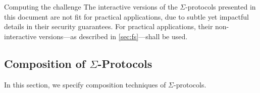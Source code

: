 \documentclass[11pt]{article}
\begin{document}



\begin{remark}{Computing the challenge}{}
  The interactive versions of the $\Sigma$-protocols presented in this document are not fit for practical applications, due to subtle yet impactful details in their security guarantees.
 For practical applications, their non-interactive versions---as described in \cref{sec:fs}---shall be used.
\end{remark}


\subsection{Composition of $\Sigma$-Protocols}
\label{sec:composition}
\label{sec:or-comp}
\label{sec:and-comp}
  In this section, we specify composition techniques of $\Sigma$-protocols.
\end{document}
